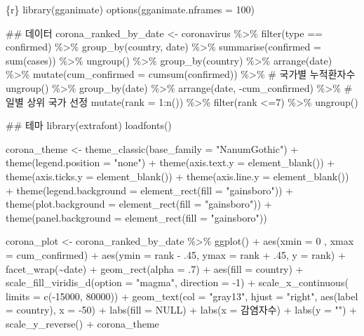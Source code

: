 \documentclass[
  letterpaper,
]{book}
\newenvironment{Shaded}{\begin{snugshade}}{\end{snugshade}}
\newcommand{\InformationTok}[1]{\textcolor[rgb]{0.37,0.37,0.37}{#1}}
\begin{document}
\begin{Shaded}
\begin{Highlighting}[]
\InformationTok{\textasciigrave{}\textasciigrave{}\textasciigrave{}\{r\}}
\InformationTok{library(gganimate) }
\InformationTok{options(gganimate.nframes = 100)}

\InformationTok{\#\# 데이터 }
\InformationTok{corona\_ranked\_by\_date \textless{}{-} coronavirus \%\textgreater{}\% }
\InformationTok{  filter(type == \textquotesingle{}confirmed\textquotesingle{}) \%\textgreater{}\% }
\InformationTok{  group\_by(country, date) \%\textgreater{}\% }
\InformationTok{  summarise(confirmed = sum(cases)) \%\textgreater{}\% }
\InformationTok{  ungroup() \%\textgreater{}\% }
\InformationTok{  group\_by(country) \%\textgreater{}\% }
\InformationTok{  arrange(date) \%\textgreater{}\% }
\InformationTok{  mutate(cum\_confirmed = cumsum(confirmed)) \%\textgreater{}\% \# 국가별 누적환자수}
\InformationTok{  ungroup() \%\textgreater{}\% }
\InformationTok{  group\_by(date) \%\textgreater{}\% }
\InformationTok{  arrange(date, {-}cum\_confirmed) \%\textgreater{}\% \# 일별 상위 국가 선정}
\InformationTok{  mutate(rank = 1:n()) \%\textgreater{}\% }
\InformationTok{  filter(rank \textless{}=7) \%\textgreater{}\% }
\InformationTok{  ungroup()}

\InformationTok{\#\# 테마}
\InformationTok{library(extrafont)}
\InformationTok{loadfonts()}

\InformationTok{corona\_theme \textless{}{-} theme\_classic(base\_family = "NanumGothic") +}
\InformationTok{  theme(legend.position = "none") +}
\InformationTok{  theme(axis.text.y = element\_blank()) +}
\InformationTok{  theme(axis.ticks.y = element\_blank()) +}
\InformationTok{  theme(axis.line.y = element\_blank()) +}
\InformationTok{  theme(legend.background = element\_rect(fill = "gainsboro")) +}
\InformationTok{  theme(plot.background = element\_rect(fill = "gainsboro")) +}
\InformationTok{  theme(panel.background = element\_rect(fill = "gainsboro"))}

\InformationTok{corona\_plot \textless{}{-} corona\_ranked\_by\_date \%\textgreater{}\% }
\InformationTok{  ggplot() +}
\InformationTok{    aes(xmin = 0 ,  }
\InformationTok{        xmax = cum\_confirmed) +  }
\InformationTok{    aes(ymin = rank {-} .45,  }
\InformationTok{        ymax = rank + .45,  }
\InformationTok{        y = rank) +}
\InformationTok{    facet\_wrap(\textasciitilde{}date) +}
\InformationTok{    geom\_rect(alpha = .7) +}
\InformationTok{    aes(fill = country) +}
\InformationTok{    scale\_fill\_viridis\_d(option = "magma",}
\InformationTok{                       direction = {-}1) +}
\InformationTok{    scale\_x\_continuous(}
\InformationTok{      limits = c({-}15000, 80000)) +}
\InformationTok{    geom\_text(col = "gray13",  }
\InformationTok{          hjust = "right",  }
\InformationTok{          aes(label = country),  }
\InformationTok{          x = {-}50) +}
\InformationTok{    labs(fill = NULL) +  }
\InformationTok{    labs(x = \textquotesingle{}감염자수\textquotesingle{}) +  }
\InformationTok{    labs(y = "") +  }
\InformationTok{    scale\_y\_reverse() +}
\InformationTok{    corona\_theme}


\end{Highlighting}
\end{Shaded}
\end{document}
